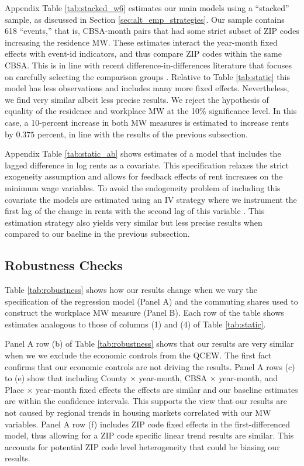 Appendix Table \ref{tab:stacked_w6} estimates our main models using a 
``stacked'' sample, as discussed in Section \ref{sec:alt_emp_strategies}.
Our sample contains 618 ``events,'' that is, CBSA-month pairs that had some 
strict subset of ZIP codes increasing the residence MW.
These estimates interact the year-month fixed effects with event-id indicators, 
and thus compare ZIP codes within the same CBSA.
This is in line with recent difference-in-differences literature that 
focuses on carefully selecting the comparison groups 
\parencite{CallawayEtAl2021, deChaisemartinEtAl2022, RothEtAl2022}.
Relative to Table \ref{tab:static} this model has less observations and includes 
many more fixed effects.
Nevertheless, we find very similar albeit less precise results.
We reject the hypothesis of equality of the residence and workplace MW at the
10\% significance level.
In this case, a 10-percent increase in both MW measures is estimated to 
increase rents by $0.375$ percent, in line with the results of the previous 
subsection.

Appendix Table \ref{tab:static_ab} shows estimates of a model that includes
the lagged difference in log rents as a covariate.
This specification relaxes the strict exogeneity assumption and allows for 
feedback effects of rent increases on the minimum wage variables.
To avoid the endogeneity problem of including this covariate the models are 
estimated using an IV strategy where we instrument the first lag of the change 
in rents with the second lag of this variable 
\parencite{ArellanoBond1991,ArellanoHonore2001}.
This estimation strategy also yields very similar but less precise results
when compared to our baeline in the previous subsection.

\subsection{Robustness Checks}

Table \ref{tab:robustness} shows how our results change when we vary the
specification of the regression model (Panel A) and the commuting shares used 
to construct the workplace MW measure (Panel B).
Each row of the table shows estimates analogous to those of columns (1) and (4)
of Table \ref{tab:static}.

Panel A row (b) of Table \ref{tab:robustness} shows that our results are very similar 
when we we exclude the economic controls from the QCEW. 
The first fact confirms that our economic controls are not driving the results.
Panel A rows (c) to (e) show that including County $\times$ year-month, 
CBSA $\times$ year-month, and Place $\times$ year-month fixed effects
the effects are similar and our baseline estimates are within the confidence 
intervals. This supports the view that our results are not caused by regional 
trends in housing markets correlated with our MW variables.
Panel A row (f) includes ZIP code fixed effects in the first-differenced model,
thus allowing for a ZIP code specific linear trend results are similar. This 
accounts for potential ZIP code level heterogeneity that could be biasing our results.

